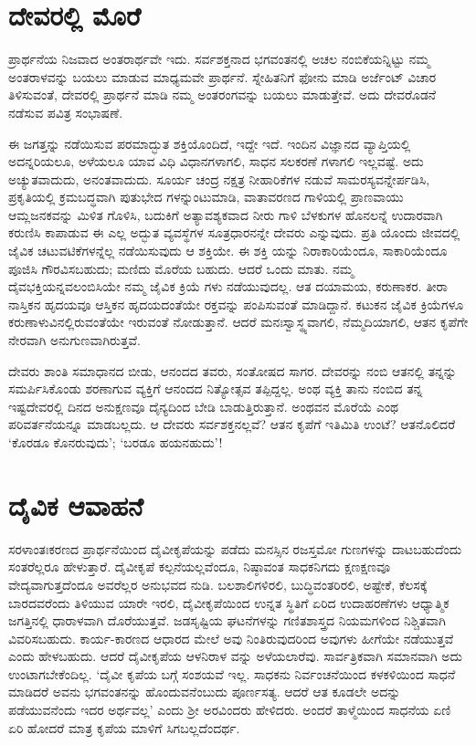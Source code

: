 \section{ದೇವರಲ್ಲಿ ಮೊರೆ}

ಪ್ರಾರ್ಥನೆಯ ನಿಜವಾದ ಅಂತರಾರ್ಥವೇ ಇದು. ಸರ್ವಶಕ್ತನಾದ ಭಗವಂತನಲ್ಲಿ ಅಚಲ ನಂಬಿಕೆಯನ್ನಿಟ್ಟು ನಮ್ಮ ಅಂತರಾಳವನ್ನು ಬಯಲು ಮಾಡುವ ಮಾಧ್ಯಮವೇ ಪ್ರಾರ್ಥನೆ. ಸ್ನೇಹಿತನಿಗೆ ಫೋನು ಮಾಡಿ ಅರ್ಜೆಂಟ್ ವಿಚಾರ ತಿಳಿಸುವಂತೆ, ದೇವರಲ್ಲಿ ಪ್ರಾರ್ಥನೆ ಮಾಡಿ ನಮ್ಮ ಅಂತರಂಗವನ್ನು ಬಯಲು ಮಾಡುತ್ತೇವೆ. ಅದು ದೇವರೊಡನೆ ನಡೆಸುವ ಪವಿತ್ರ ಸಂಭಾಷಣೆ.

ಈ ಜಗತ್ತನ್ನು ನಡೆಯಿಸುವ ಪರಮಾದ್ಭುತ ಶಕ್ತಿಯೊಂದಿದೆ, ಇದ್ದೇ ಇದೆ. ಇಂದಿನ ವಿಜ್ಞಾನದ ವ್ಯಾಪ್ತಿಯಲ್ಲಿ ಅದನ್ನರಿಯಲೂ, ಅಳೆಯಲೂ ಯಾವ ವಿಧಿ ವಿಧಾನಗಳಾಗಲಿ, ಸಾಧನ ಸಲಕರಣೆ ಗಳಾಗಲಿ ಇಲ್ಲವಷ್ಟೆ. ಅದು ಅಚ್ಯುತವಾದುದು, ಅನಂತವಾದುದು. ಸೂರ್ಯ ಚಂದ್ರ ನಕ್ಷತ್ರ ನೀಹಾರಿಕೆಗಳ ನಡುವೆ ಸಾಮರಸ್ಯವನ್ನೇರ್ಪಡಿಸಿ, ಪ್ರಕೃತಿಯಲ್ಲಿ ಕ್ರಮಬದ್ಧವಾಗಿ ಪುತುಭೇದ ಗಳನ್ನುಂಟುಮಾಡಿ, ವಾತಾವರಣದ ಗಾಳಿಯಲ್ಲಿ ಪ್ರಾಣವಾಯು ಆಮ್ಲಜನಕವನ್ನು ಮಿಳಿತ ಗೊಳಿಸಿ, ಬದುಕಿಗೆ ಅತ್ಯಾವಶ್ಯಕವಾದ ನೀರು ಗಾಳಿ ಬೆಳಕುಗಳ ಹೊನಲನ್ನೆ ಉದಾರವಾಗಿ ಕರುಣಿಸಿ ಕಾಪಾಡುವ ಈ ಎಲ್ಲ ಅದ್ಭುತ ವ್ಯವಸ್ಥೆಗಳ ಸೂತ್ರಧಾರನನ್ನೇ ದೇವರು ಎನ್ನುವುದು. ಪ್ರತಿ ಯೊಂದು ಜೀವದಲ್ಲಿ ಜೈವಿಕ ಚಟುವಟಿಕೆಗಳನ್ನೆಲ್ಲ ನಡೆಯಿಸುವುದು ಆ ಶಕ್ತಿಯೇ. ಈ ಶಕ್ತಿ ಯನ್ನು ನಿರಾಕಾರಿಯೆಂದೂ, ಸಾಕಾರಿಯೆಂದೂ ಪೂಜಿಸಿ ಗೌರವಿಸಬಹುದು; ಮಣಿದು ಮೊರೆಯ ಬಹುದು. ಆದರೆ ಒಂದು ಮಾತು. ನಮ್ಮ ದೈವಭಕ್ತಿಯನ್ನವಲಂಬಿಸಿಯೇ ನಮ್ಮ ಜೈವಿಕ ಕ್ರಿಯೆ ಗಳು ನಡೆಯುವುದಲ್ಲ. ಆತ ದಯಾಮಯ, ಕರುಣಾಕರ. ತೀರಾ ನಾಸ್ತಿಕನ ಹೃದಯವೂ ಆಸ್ತಿಕನ ಹೃದಯದಂತೆಯೇ ರಕ್ತವನ್ನು ಪಂಪಿಸುವಂತೆ ಮಾಡಿದ್ದಾನೆ. ಕಟುಕನ ಜೈವಿಕ ಕ್ರಿಯೆಗಳೂ ಕರುಣಾಳುವಿನಲ್ಲಿರುವಂತೆಯೇ ಇರುವಂತೆ ನೋಡುತ್ತಾನೆ. ಆದರೆ ಮನಃಸ್ವಾಸ್ಥ್ಯವಾಗಲಿ, ನೆಮ್ಮದಿಯಾಗಲಿ, ಆತನ ಕೃಪೆಗೇ ನೇರವಾಗಿ ಅನುಗುಣವಾಗಿರುತ್ತವೆ.

ದೇವರು ಶಾಂತಿ ಸಮಾಧಾನದ ಬೀಡು, ಆನಂದದ ತವರು, ಸಂತೋಷದ ಸಾಗರ. ದೇವರನ್ನು ನಂಬಿ ಆತನಲ್ಲಿ ತನ್ನನ್ನು ಸಮರ್ಪಿಸಿಕೊಂಡು ಶರಣಾಗುವ ವ್ಯಕ್ತಿಗೆ ಆನಂದದ ನಿತ್ಯೋತ್ಸವ ತಪ್ಪಿದ್ದಲ್ಲ. ಅಂಥ ವ್ಯಕ್ತಿ ತಾನು ನಂಬಿದ ತನ್ನ ಇಷ್ಟದೇವರಲ್ಲಿ ದಿನದ ಅನುಕ್ಷಣವೂ ದೈನ್ಯದಿಂದ ಬೇಡಿ ಬಾಡುತ್ತಿರುತ್ತಾನೆ. ಅಂಥವನ ಮೊರೆಯೆ ಎಂಥ ಪರಿವರ್ತನೆಯನ್ನೂ ಮಾಡಬಲ್ಲದು. ಆ ದೇವರು ಸರ್ವಶಕ್ತನಲ್ಲವೆ? ಆತನ ಕೃಪೆಗೆ ಇತಿಮಿತಿ ಉಂಟೆ? ಆತನೊಲಿದರೆ ‘ಕೊರಡೂ ಕೊನರುವುದು’; ‘ಬರಡೂ ಹಯನಹುದು’!


\section{ದೈವಿಕ ಆವಾಹನೆ}

ಸರಳಾಂತಃಕರಣದ ಪ್ರಾರ್ಥನೆಯಿಂದ ದೈವೀಕೃಪೆಯನ್ನು ಪಡೆದು ಮನಸ್ಸಿನ ರಜಸ್ತಮೋ ಗುಣಗಳನ್ನು ದಾಟಬಹುದೆಂದು ಸಂತರೆಲ್ಲರೂ ಹೇಳುತ್ತಾರೆ. ದೈವೀಕೃಪೆ ಕಲ್ಪನೆಯಲ್ಲವೆಂದೂ, ನಿಷ್ಠಾವಂತ ಸಾಧಕನಿಗದು ಕ್ಷಣಕ್ಷಣವೂ ವೇದ್ಯವಾಗುತ್ತದೆಂದೂ ಅವರೆಲ್ಲರ ಅನುಭವದ ನುಡಿ. ಬಲಶಾಲಿಗಳಿರಲಿ, ಬುದ್ಧಿವಂತರಿರಲಿ, ಅಷ್ಟೇಕೆ, ಕೆಲಸಕ್ಕೆ ಬಾರದವರೆಂದು ತಿಳಿಯುವ ಯಾರೇ ಇರಲಿ, ದೈವೀಕೃಪೆಯಿಂದ ಉನ್ನತ ಸ್ಥಿತಿಗೆ ಏರಿದ ಉದಾಹರಣೆಗಳು ಆಧ್ಯಾತ್ಮಿಕ ಜಗತ್ತಿನಲ್ಲಿ ಧಾರಾಳವಾಗಿ ದೊರೆಯುತ್ತವೆ. ಜಡಸೃಷ್ಟಿಯ ಘಟನೆಗಳನ್ನು ಗಣಿತಶಾಸ್ತ್ರದ ನಿಯಮಗಳಿಂದ ನಿಶ್ಚಿತವಾಗಿ ವಿವರಿಸಬಹುದು. ಕಾರ್ಯ-ಕಾರಣದ ಆಧಾರದ ಮೇಲೆ ಅವು ನಿಂತಿರುವುದರಿಂದ ಅವುಗಳು ಹೀಗೆಯೇ ನಡೆಯುತ್ತವೆ ಎಂದು ಹೇಳಬಹುದು. ಆದರೆ ದೈವೀಕೃಪೆಯ ಆಳನಿರಾಳ ವನ್ನು ಅಳೆಯಲಾರೆವು. ಸಾರ್ವತ್ರಿಕವಾಗಿ ಸಮಾನವಾಗಿ ಅದು ಉಂಟಾಗಬೇಕೆಂದಿಲ್ಲ. ‘ದೈವೀ ಕೃಪೆಯ ಬಗ್ಗೆ ಸಂಶಯವೆ ಇಲ್ಲ. ಸಾಧಕನು ನಿರ್ವಂಚನೆಯಿಂದ ಕಳಕಳಿಯಿಂದ ಸಾಧನೆ ಮಾಡಿದರೆ ಅವನು ಭಗವಂತನನ್ನು ಹೊಂದುವನೆಂಬುದು ಪೂರ್ಣಸತ್ಯ. ಆದರೆ ಆತ ಕೂಡಲೇ ಅದನ್ನು ಪಡೆಯುವನೆಂದು ಇದರ ಅರ್ಥವಲ್ಲ’ ಎಂದು ಶ‍್ರೀ ಅರವಿಂದರು ಹೇಳಿದರು. ಅಂದರೆ ತಾಳ್ಮೆಯಿಂದ ಸಾಧನೆಯ ಏಣಿ ಏರಿ ಹೋದರೆ ಮಾತ್ರ ಕೃಪೆಯ ಮಾಳಿಗೆ ಸಿಗಬಲ್ಲದೆಂದರ್ಥ.

